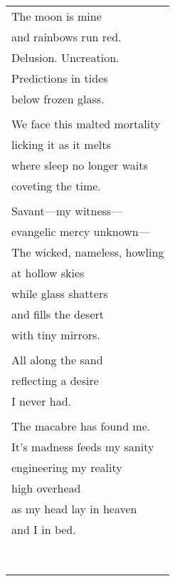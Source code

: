 \documentclass{article}
\begin{document}
\begin{center}
\begin{tabular}{l}
The moon is mine \\
and rainbows run red. \\
Delusion. Uncreation. \\
Predictions in tides \\
below frozen glass. \\
\\
We face this malted mortality \\
licking it as it melts \\
where sleep no longer waits \\
coveting the time. \\
\\
Savant---my witness--- \\
evangelic mercy unknown--- \\
The wicked, nameless, howling \\
at hollow skies \\
while glass shatters \\
and fills the desert \\
with tiny mirrors. \\
\\
All along the sand \\
reflecting a desire \\
I never had. \\
\\
The macabre has found me. \\
It's madness feeds my sanity \\
engineering my reality \\
high overhead \\
as my head lay in heaven \\
and I in bed. \\
\\
\\
\\
\\
\\
\\
\\
\\
\end{tabular}
\end{center}
\end{document}
